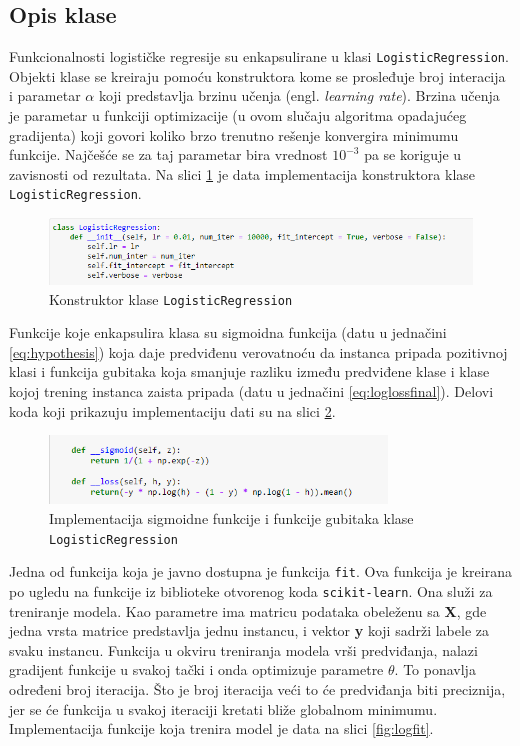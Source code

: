 \documentclass[a4paper,12pt]{report}
\begin{document}
\subsection{Opis klase}

Funkcionalnosti logističke regresije su enkapsulirane u klasi \texttt{LogisticRegression}. Objekti klase se kreiraju pomoću konstruktora kome se prosleđuje broj interacija i parametar $\alpha$ koji predstavlja brzinu učenja (engl. \textit{learning rate}). Brzina učenja je parametar u funkciji optimizacije (u ovom slučaju algoritma opadajućeg gradijenta) koji govori koliko brzo trenutno rešenje konvergira minimumu funkcije. Najčešće se za taj parametar bira vrednost $10^{-3}$ pa se koriguje u zavisnosti od rezultata. Na slici \ref{fig:logconst} je data implementacija konstruktora klase \texttt{LogisticRegression}.

\begin{figure}[h]
    \centering
    \includegraphics[width=\textwidth]{logistic_constructor.png}
    \caption{Konstruktor klase \texttt{LogisticRegression}}\label{fig:logconst}
\end{figure}

Funkcije koje enkapsulira klasa su sigmoidna funkcija (datu u jednačini \ref{eq:hypothesis}) koja daje predviđenu verovatnoću da instanca pripada pozitivnoj klasi i funkcija gubitaka koja smanjuje razliku između predviđene klase i klase kojoj trening instanca zaista pripada (datu u jednačini \ref{eq:loglossfinal}). Delovi koda koji prikazuju implementaciju dati su na slici \ref{fig:logsigloss}.

\begin{figure}[h]
    \centering
    \includegraphics[width=0.8\textwidth]{logistic_sigmoid_loss.png}
    \caption{Implementacija sigmoidne funkcije i funkcije gubitaka klase \texttt{LogisticRegression}}\label{fig:logsigloss}
\end{figure}

Jedna od funkcija koja je javno dostupna je funkcija \texttt{fit}. Ova funkcija je kreirana po ugledu na funkcije iz biblioteke otvorenog koda \texttt{scikit-learn}. Ona služi za treniranje modela. Kao parametre ima matricu podataka obeleženu sa \textbf{X}, gde jedna vrsta matrice predstavlja jednu instancu, i vektor \textbf{y} koji sadrži labele za svaku instancu. Funkcija u okviru treniranja modela vrši predviđanja, nalazi gradijent funkcije u svakoj tački i onda optimizuje parametre $\theta$. To ponavlja određeni broj iteracija. Što je broj iteracija veći to 
će predviđanja biti preciznija, jer se će funkcija u svakoj iteraciji kretati bliže globalnom minimumu. Implementacija funkcije koja trenira model je data na slici \ref{fig:logfit}.
\end{document}
